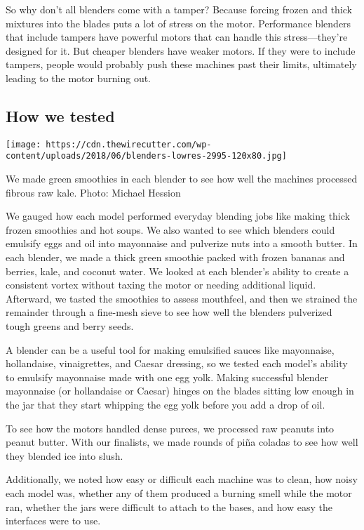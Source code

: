 So why don't all blenders come with a tamper? Because forcing frozen and
thick mixtures into the blades puts a lot of stress on the motor.
Performance blenders that include tampers have powerful motors that can
handle this stress---they're designed for it. But cheaper blenders have
weaker motors. If they were to include tampers, people would probably
push these machines past their limits, ultimately leading to the motor
burning out.

\hypertarget{how-we-tested}{%
\subsection{How we tested}\label{how-we-tested}}

\texttt{[image: https://cdn.thewirecutter.com/wp-content/uploads/2018/06/blenders-lowres-2995-120x80.jpg]}

We made green smoothies in each blender to see how well the machines
processed fibrous raw kale. Photo: Michael Hession

We gauged how each model performed everyday blending jobs like making
thick frozen smoothies and hot soups. We also wanted to see which
blenders could emulsify eggs and oil into mayonnaise and pulverize nuts
into a smooth butter. In each blender, we made a thick green smoothie
packed with frozen bananas and berries, kale, and coconut water. We
looked at each blender's ability to create a consistent vortex without
taxing the motor or needing additional liquid. Afterward, we tasted the
smoothies to assess mouthfeel, and then we strained the remainder
through a fine-mesh sieve to see how well the blenders pulverized tough
greens and berry seeds.

A blender can be a useful tool for making emulsified sauces like
mayonnaise, hollandaise, vinaigrettes, and Caesar dressing, so we tested
each model's ability to emulsify mayonnaise made with one egg yolk.
Making successful blender mayonnaise (or hollandaise or Caesar) hinges
on the blades sitting low enough in the jar that they start whipping the
egg yolk before you add a drop of oil.

To see how the motors handled dense purees, we processed raw peanuts
into peanut butter. With our finalists, we made rounds of piña coladas
to see how well they blended ice into slush.

Additionally, we noted how easy or difficult each machine was to clean,
how noisy each model was, whether any of them produced a burning smell
while the motor ran, whether the jars were difficult to attach to the
bases, and how easy the interfaces were to use.

